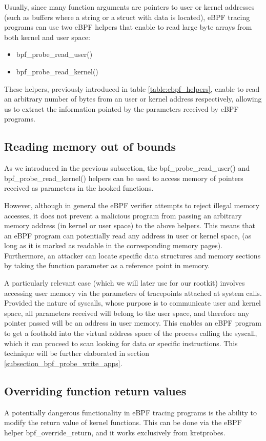 \documentclass[12pt]{report} %
\begin{document}
Usually, since many function arguments are pointers to user or kernel addresses (such as buffers where a string or a struct with data is located), eBPF tracing programs can use two eBPF helpers that enable to read large byte arrays from both kernel and user space:
\begin{itemize}
\item bpf\_probe\_read\_user()
\item bpf\_probe\_read\_kernel()
\end{itemize}

These helpers, previously introduced in table \ref{table:ebpf_helpers}, enable to read an arbitrary number of bytes from an user or kernel address respectively, allowing us to extract the information pointed by the parameters received by eBPF programs.

\subsection{Reading memory out of bounds} \label{subsection:out_read_bounds}
As we introduced in the previous subsection, the bpf\_probe\_read\_user() and bpf\_probe\_read\_kernel() helpers can be used to access memory of pointers received as parameters in the hooked functions. 

However, although in general the eBPF verifier attempts to reject illegal memory accesses, it does not prevent a malicious program from passing an arbitrary memory address (in kernel or user space) to the above helpers. This means that an eBPF program can potentially read any address in user or kernel space, (as long as it is marked as readable in the corresponding memory pages). Furthermore, an attacker can locate specific data structures and memory sections by taking the function parameter as a reference point in memory.

A particularly relevant case (which we will later use for our rootkit) involves accessing user memory via the parameters of tracepoints attached at system calls. Provided the nature of syscalls, whose purpose is to communicate user and kernel space, all parameters received will belong to the user space, and therefore any pointer passed will be an address in user memory. This enables an eBPF program to get a foothold into the virtual address space of the process calling the syscall, which it can proceed to scan looking for data or specific instructions. This technique will be further elaborated in section \ref{subsection_bpf_probe_write_apps}.

\subsection{Overriding function return values}
A potentially dangerous functionality in eBPF tracing programs is the ability to modify the return value of kernel functions\cite{ebpf_friends_p15}\cite{ebpf_override_return}. This can be done via the eBPF helper bpf\_override\_return, and it works exclusively from kretprobes.
\end{document}
